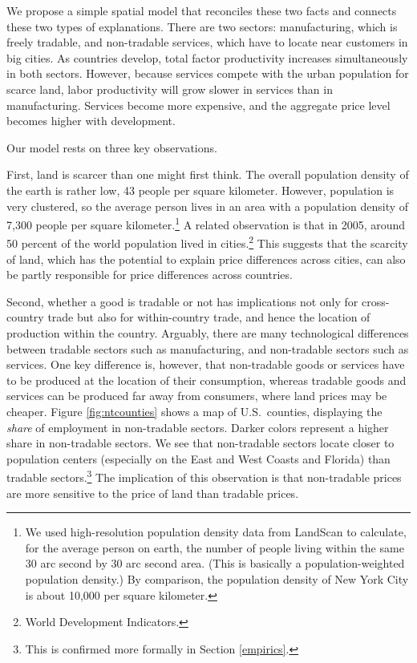 \documentclass[12pt]{article}
\begin{document}
We propose a simple spatial model that reconciles these two facts and connects these two types of explanations. There are two sectors: manufacturing, which is freely tradable, and non-tradable services, which have to locate near customers in big cities. As countries develop, total factor productivity increases simultaneously in both sectors. However, because services compete with the urban population for scarce land, labor productivity will grow slower in services than in manufacturing. Services become more expensive, and the aggregate price level becomes higher with development.

Our model rests on three key observations.

First, land is scarcer than one might first think. The overall population density of the earth is rather low, 43 people per square kilometer.  However, population is very clustered, so the average person lives in an area with a population density of 7,300 people per square kilometer.\footnote{We used high-resolution population density data from LandScan to calculate, for the average person on earth, the number of people living within the same 30 arc second by 30 arc second area. (This is basically a population-weighted population density.) By comparison, the population density of New York City is about 10,000 per square kilometer.} A related observation is that in 2005, around 50 percent of the world population lived in cities.\footnote{World Development Indicators.} This suggests that the scarcity of land, which has the potential to explain price differences across cities, can also be partly responsible for price differences across countries.

Second, whether a good is tradable or not has implications not only for cross-country trade but also for within-country trade, and hence the location of production within the country. Arguably, there are many technological differences between tradable sectors such as manufacturing, and non-tradable sectors such as services. One key difference is, however, that non-tradable goods or services have to be produced at the location of their consumption, whereas tradable goods and services can be produced far away from consumers, where land prices may be cheaper. Figure \ref{fig:ntcounties} shows a map of U.S.~counties, displaying the \emph{share} of employment in non-tradable sectors. Darker colors represent a higher share in non-tradable sectors. We see that non-tradable sectors locate closer to population centers (especially on the East and West Coasts and Florida) than tradable sectors.\footnote{This is confirmed more formally in Section \ref{empirics}.} The implication of this observation is that non-tradable prices are more sensitive to the price of land than tradable prices.
\end{document}
